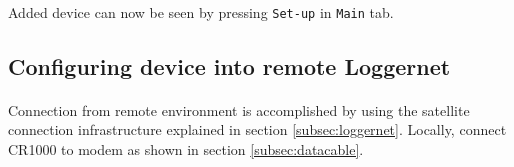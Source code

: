 \paragraph{}
Added device can now be seen by pressing {\tt Set-up} in {\tt Main} tab.

\subsection{Configuring device into remote Loggernet}
\paragraph{}
Connection from remote environment is accomplished by using the satellite connection infrastructure explained in section \ref{subsec:loggernet}.
Locally, connect CR1000 to modem as shown in section \ref{subsec:datacable}.
